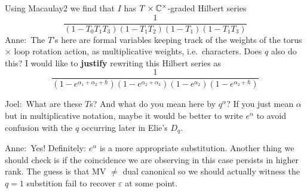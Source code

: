 \documentclass[11pt]{article}
\newcommand{\anne}[1]{{\color{pink!50!blue}Anne:~#1}}
\newcommand{\joel}[1]{{\color{red!50!orange}Joel:~#1}}
\newcommand{\todo}[1]{{\color{red!50!white}\textbf{#1}}} %
\begin{document}
\begin{description}
Using Macaulay2 we find that $I$ has $T\times\mathbb C^\times$-graded Hilbert series
\[
    \frac{1}{\left(1-{T}_{0}{T}_{1}{T}_{3}\right)\left(1-{T}_{1}{T}_{2}\right)\left(1-{T}_{1}\right)\left(1-{T}_{1}{T}_{3}\right)}    
\]
\anne{The $T$'s here are formal variables keeping track of the weights of the torus $\times$ loop rotation action, as multiplicative weights, i.e.\ characters. 
Does $q$ also do this? I would like to \todo{justify} rewriting this Hilbert series as 
\[
    \frac{1}{(1 - e^{\alpha_1 + \alpha_2 + \hbar})(1-e^{\alpha_2 + \alpha_3})(1-e^{\alpha_2})(1-e^{\alpha_2 + \hbar})}    
\]
}

\joel{What are these $T$s? And what do you mean here by $ q^\alpha$? If you just mean $ \alpha$ but in multiplicative notation, maybe it would be better to write $ e^\alpha$ to avoid confusion with the $ q $ occurring later in Elie's $D_q$.}

\anne{Yes! Definitely: $e^\alpha$ is a more appropriate substitution. Another thing we should check is if the coincidence we are observing in this case persists in higher rank. The guess is that MV $\neq$ dual canonical so we should actually witness the $q=1$ substition fail to recover $\varepsilon$ at some point.}


\end{description}
\end{document}
